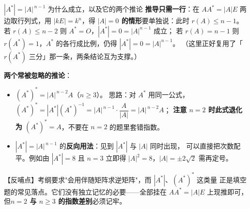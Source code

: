 \begin{fdeep}{$|A^{*}|=|A|^{\,n-1}$ 为什么成立，以及它的两个推论}
\textbf{推导只需一行}：在 $AA^{*}=|A|E$ 两边取行列式，用 $|kE|=k^{n}$，得
\textbf{$|A|=0$ 的情形}要单独说：此时 $r(A)\le n-1$。
若 $r(A)\le n-2$ 则 $A^{*}=O$，$|A^{*}|=0=|A|^{n-1}$ 成立；
若 $r(A)=n-1$ 则 $r(A^{*})=1$，$A^{*}$ 的各行成比例，仍得 $|A^{*}|=0=|A|^{n-1}$。
（这里正好复用了「$r(A^{*})$ 三分」那一条，两条结论互为支撑。）

\medskip
\textbf{两个常被忽略的推论}：
\begin{itemize}[leftmargin=2.2em,itemsep=0.22em]
\item $(A^{*})^{*}=|A|^{\,n-2}A$（$n\ge3$）。
      思路：对 $A^{*}$ 用同一公式，$(A^{*})^{*}=|A^{*}|(A^{*})^{-1}=|A|^{\,n-1}\cdot\dfrac{A}{|A|}=|A|^{\,n-2}A$；
      \textbf{注意 $n=2$ 时此式退化为 $(A^{*})^{*}=A$}，不要在 $n=2$ 的题里套错指数。
\item $|A^{*}|=|A|^{\,n-1}$ 的\textbf{反向用法}：见到 $|A^{*}|$ 与 $|A|$ 同时出现，
      可以直接把次数配平。例如由 $|A^{*}|=8$ 且 $n=3$ 立即得 $|A|^{2}=8$，$|A|=\pm2\sqrt2$ 需再定号。
\end{itemize}
【反哺点】考纲要求"会用伴随矩阵求逆矩阵"，而 $|A^{*}|$、$(A^{*})^{*}$ 这类量
正是填空题的常见落点。它们没有独立记忆的必要——全部挂在 $AA^{*}=|A|E$ 上现推即可，
但\textbf{$n=2$ 与 $n\ge3$ 的指数差别}必须记牢。
\end{fdeep}

